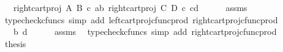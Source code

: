 \begin{isabellebody}
\ {\isachardoublequoteopen}{\isachardot}{\kern0pt}{\isachardot}{\kern0pt}{\isachardot}{\kern0pt}\ {\isacharequal}{\kern0pt}\ {\isasymlangle}right{\isacharunderscore}{\kern0pt}cart{\isacharunderscore}{\kern0pt}proj\ A\ B\ {\isasymcirc}\isactrlsub c\ {\isasymlangle}a{\isacharcomma}{\kern0pt}b{\isasymrangle}{\isacharcomma}{\kern0pt}\ right{\isacharunderscore}{\kern0pt}cart{\isacharunderscore}{\kern0pt}proj\ C\ D\ {\isasymcirc}\isactrlsub c\ {\isasymlangle}c{\isacharcomma}{\kern0pt}d{\isasymrangle}{\isasymrangle}{\isachardoublequoteclose}\isanewline
\ \ \ \ \isamarkupfalse%
\ assms\ \isamarkupfalse%
\ {\isacharparenleft}{\kern0pt}typecheck{\isacharunderscore}{\kern0pt}cfuncs{\isacharcomma}{\kern0pt}\ simp\ add{\isacharcolon}{\kern0pt}\ left{\isacharunderscore}{\kern0pt}cart{\isacharunderscore}{\kern0pt}proj{\isacharunderscore}{\kern0pt}cfunc{\isacharunderscore}{\kern0pt}prod\ right{\isacharunderscore}{\kern0pt}cart{\isacharunderscore}{\kern0pt}proj{\isacharunderscore}{\kern0pt}cfunc{\isacharunderscore}{\kern0pt}prod{\isacharparenright}{\kern0pt}\isanewline
\ \ \isamarkupfalse%
\ \isamarkupfalse%
\ {\isachardoublequoteopen}{\isachardot}{\kern0pt}{\isachardot}{\kern0pt}{\isachardot}{\kern0pt}\ {\isacharequal}{\kern0pt}\ {\isasymlangle}b{\isacharcomma}{\kern0pt}\ d{\isasymrangle}{\isachardoublequoteclose}\isanewline
\ \ \ \ \isamarkupfalse%
\ assms\ \isamarkupfalse%
\ {\isacharparenleft}{\kern0pt}typecheck{\isacharunderscore}{\kern0pt}cfuncs{\isacharcomma}{\kern0pt}\ simp\ add{\isacharcolon}{\kern0pt}\ right{\isacharunderscore}{\kern0pt}cart{\isacharunderscore}{\kern0pt}proj{\isacharunderscore}{\kern0pt}cfunc{\isacharunderscore}{\kern0pt}prod{\isacharparenright}{\kern0pt}\isanewline
\ \ \isamarkupfalse%
\ \isamarkupfalse%
\ {\isacharquery}{\kern0pt}thesis\isacommand{{\isachardot}{\kern0pt}}\isamarkupfalse%
\isanewline
{}\isamarkupfalse%
%
\endisatagproof
{\isafoldproof}%
%
\isadelimproof
\isanewline
%
\endisadelimproof
%
\isadelimtheory
\isanewline
%
\endisadelimtheory
%
\isatagtheory
{}\isamarkupfalse%
%
\endisatagtheory
{\isafoldtheory}%
%
\isadelimtheory
%
\endisadelimtheory
%
\end{isabellebody}%
\endinput

